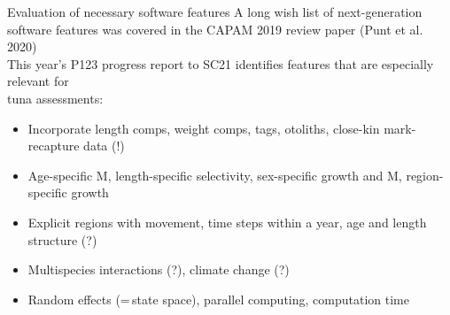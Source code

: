 \documentclass[aspectratio=169,fleqn]{beamer}
\begin{document}
\begin{frame}{Evaluation of necessary software features}\small
  A long wish list of next-generation software features was covered in the CAPAM
  2019 review paper (Punt et al. 2020)\\[2.5ex]
  This year's P123 progress report to SC21 identifies features that are
  especially relevant for\\
  tuna assessments:\\[1.5ex]
  \begin{itemize}
    \item Incorporate length comps, weight comps, tags, otoliths, close-kin
    mark-recapture data (!)\\[2ex]
    \item Age-specific M, length-specific selectivity, sex-specific growth and
    M, region-specific growth\\[2ex]
    \item Explicit regions with movement, time steps within a year, age and
    length structure (?)\\[2ex]
    \item Multispecies interactions (?), climate change (?)\\[2ex]
    \item Random effects (=\,state space), parallel computing, computation
    time\\[2ex]
  \end{itemize}
\end{frame}

\end{document}
